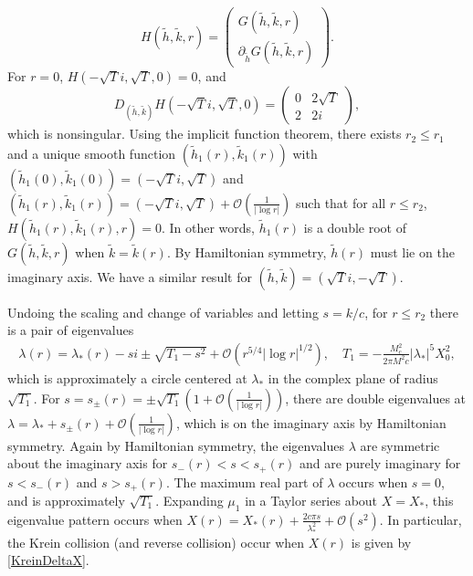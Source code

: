 \documentclass[12pt]{elsarticle}
\theoremstyle{plain}
\theoremstyle{definition}
\theoremstyle{remark}
\numberwithin{theorem}{section}
\numberwithin{equation}{section}
\begin{document}
\[
H(\tilde{h}, \tilde{k}, r) = \begin{pmatrix} G(\tilde{h}, \tilde{k}, r) \\
\partial_{\tilde{h}} G(\tilde{h}, \tilde{k}, r) \end{pmatrix}.
\]
For $r = 0$, $H(-\sqrt{T}i, \sqrt{T}, 0) = 0$, and
\begin{equation*}
D_{(\tilde{h}, \tilde{k})}H(-\sqrt{T}i, \sqrt{T}, 0) = 
\begin{pmatrix}
0 & 2 \sqrt{T} \\
2 & 2i
\end{pmatrix},
\end{equation*}
which is nonsingular. Using the implicit function theorem, there exists $r_2 \leq r_1$ and a unique smooth function $(\tilde{h}_1(r), \tilde{k}_1(r))$ with $(\tilde{h}_1(0), \tilde{k}_1(0)) = (-\sqrt{T}i, \sqrt{T})$ and $(\tilde{h}_1(r), \tilde{k}_1(r)) = (-\sqrt{T}i, \sqrt{T}) + \mathcal{O}\left(\frac{1}{|\log r|}\right)$ such that for all $r \leq r_2$, $H(\tilde{h}_1(r), \tilde{k}_1(r), r) = 0$. In other words, $\tilde{h}_1(r)$ is a double root of $G(\tilde{h}, \tilde{k}, r)$ when $\tilde{k} = \tilde{k}(r)$. By Hamiltonian symmetry, $\tilde{h}(r)$ must lie on the imaginary axis. We have a similar result for $(\tilde{h}, \tilde{k}) = (\sqrt{T}i, -\sqrt{T})$.

Undoing the scaling and change of variables and letting $s = k/c$, for $r \leq r_2$ there is a pair of eigenvalues
\begin{align*}
\lambda(r) = \lambda_*(r) - s i \pm \sqrt{ T_1 -  s^2} + \mathcal{O}(r^{5/4}|\log r|^{1/2}), \quad T_1 = -\frac{M_c^2}{2 \pi M^2 c } |\lambda_*|^5 X_0^2,
\end{align*}
which is approximately a circle centered at $\lambda_*$ in the complex plane of radius $\sqrt{T_1}$. For $s = s_\pm(r) = \pm \sqrt{T_1}\left( 1 + \mathcal{O}\left(\frac{1}{|\log r|} \right) \right)$, there are double eigenvalues at $\lambda = \lambda_* + s_\pm(r) + \mathcal{O}\left(\frac{1}{|\log r|} \right)$, which is on the imaginary axis by Hamiltonian symmetry. Again by Hamiltonian symmetry, the eigenvalues $\lambda$ are symmetric about the imaginary axis for $s_-(r) < s < s_+(r)$ and are purely imaginary for $s < s_-(r)$ and $s > s_+(r)$. The maximum real part of $\lambda$ occurs when $s = 0$, and is approximately $\sqrt{T_1}$. Expanding $\mu_1$ in a Taylor series about $X = X_*$, this eigenvalue pattern occurs when $X(r) = X_*(r) + \frac{2 c \pi s}{\lambda_*^2} + \mathcal{O}(s^2)$. In particular, the Krein collision (and reverse collision) occur when $X(r)$ is given by \cref{KreinDeltaX}.
\end{document}

